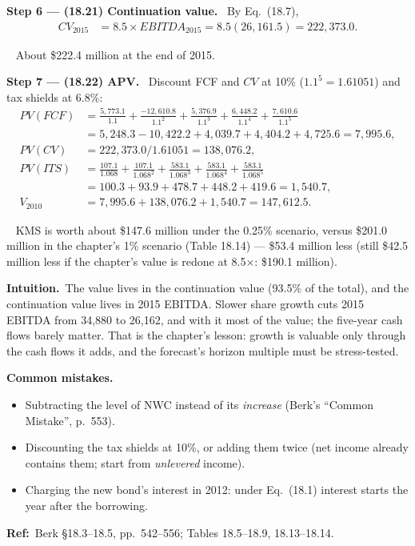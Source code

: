 \documentclass[11pt,a4paper]{article}
\newcommand{\step}[2]{\par\medskip\noindent\textbf{Step #1 --- #2.}~}
\newcommand{\intuition}{\par\medskip\noindent\textbf{Intuition.}~}
\newcommand{\refbib}{\par\smallskip\noindent\textbf{Ref:}~}
\newcommand{\answer}[1]{\par\smallskip\noindent\fbox{\textbf{Answer #1.}}~}
\newcommand{\pitfalls}{\par\medskip\noindent\textbf{Common mistakes.}}
\begin{document}
\step{6}{(18.21) Continuation value} By Eq.~(18.7),
\begin{align}
  CV_{2015} &= 8.5\times EBITDA_{2015} = 8.5(26{,}161.5) = 222{,}373.0. \label{r2ce15-cv}
\end{align}
\answer{(18.21)} About \$222.4 million at the end of 2015.

\step{7}{(18.22) APV} Discount FCF and $CV$ at 10\% ($1.1^5=1.61051$) and tax shields at 6.8\%:
\begin{align}
  PV(FCF) &= \frac{5{,}773.1}{1.1}+\frac{-12{,}610.8}{1.1^2}+\frac{5{,}376.9}{1.1^3}+\frac{6{,}448.2}{1.1^4}+\frac{7{,}610.6}{1.1^5} \nonumber\\
  &= 5{,}248.3-10{,}422.2+4{,}039.7+4{,}404.2+4{,}725.6 = 7{,}995.6, \nonumber\\
  PV(CV) &= 222{,}373.0/1.61051 = 138{,}076.2, \nonumber\\
  PV(ITS) &= \frac{107.1}{1.068}+\frac{107.1}{1.068^2}+\frac{583.1}{1.068^3}+\frac{583.1}{1.068^4}+\frac{583.1}{1.068^5} \nonumber\\
  &= 100.3+93.9+478.7+448.2+419.6 = 1{,}540.7, \nonumber\\
  V_{2010} &= 7{,}995.6+138{,}076.2+1{,}540.7 = 147{,}612.5. \label{r2ce15-v}
\end{align}
\answer{(18.22)} KMS is worth about \$147.6 million under the 0.25\% scenario, versus \$201.0 million in the
chapter's 1\% scenario (Table 18.14) --- \$53.4 million less (still \$42.5 million less if the chapter's
value is redone at 8.5$\times$: \$190.1 million).

\intuition The value lives in the continuation value (93.5\% of the total), and the continuation value
lives in 2015 EBITDA. Slower share growth cuts 2015 EBITDA from 34,880 to 26,162, and with it most of the
value; the five-year cash flows barely matter. That is the chapter's lesson: growth is valuable only
through the cash flows it adds, and the forecast's horizon multiple must be stress-tested.
\pitfalls
\begin{itemize}
  \item Subtracting the level of NWC instead of its \emph{increase} (Berk's ``Common Mistake'', p.~553).
  \item Discounting the tax shields at 10\%, or adding them twice (net income already contains them; start from \emph{unlevered} income).
  \item Charging the new bond's interest in 2012: under Eq.~(18.1) interest starts the year after the borrowing.
\end{itemize}
\refbib{Berk \S18.3--18.5, pp.~542--556; Tables 18.5--18.9, 18.13--18.14.}
\end{document}

